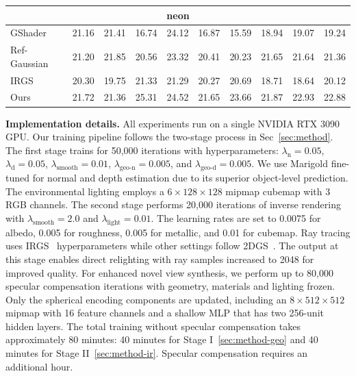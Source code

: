 \begin{table}[h!]
{\begin{tabular}{lccccccccc}
\multicolumn{10}{c}{\textbf{neon}} \\ \hline
\multicolumn{1}{l|}{GShader\cite{jiang2024gaussianshader}} & 21.16 & 21.41 & 16.74 & 24.12 & 16.87 & 15.59 & 18.94 & 19.07 & 19.24 \\
\multicolumn{1}{l|}{Ref-Gaussian\cite{yao2024refgaussian}} & 21.20 & \cellcolor[HTML]{FD6864}21.85 & 20.56 & 23.32 & 20.41 & 20.23 & 21.65 & 21.64 & 21.36 \\
\multicolumn{1}{l|}{IRGS\cite{gu2025irgs}} & 20.30 & 19.75 & 21.33 & 21.29 & 20.27 & 20.69 & 18.71 & 18.64 & 20.12 \\
\multicolumn{1}{l|}{Ours} & \cellcolor[HTML]{FD6864}21.72 & 21.36 & \cellcolor[HTML]{FD6864}25.31 & \cellcolor[HTML]{FD6864}24.52 & \cellcolor[HTML]{FD6864}21.65 & \cellcolor[HTML]{FD6864}23.66 & \cellcolor[HTML]{FD6864}21.87 & \cellcolor[HTML]{FD6864}22.93 & \cellcolor[HTML]{FD6864}22.88 \\ \hline
\hline
\end{tabular}%
}
\vspace{-1em}
\end{table}

\noindent\textbf{Implementation details.}
All experiments run on a single NVIDIA RTX 3090 GPU. Our training pipeline follows the two-stage process in Sec~\ref{sec:method}. The first stage trains for 50,000 iterations with hyperparameters: $\lambda_{\mathrm{n}} = 0.05$, $\lambda_{\mathrm{d}} = 0.05$, $\lambda_{\text{smooth}} = 0.01$, $\lambda_{\text{geo-n}} = 0.005$, and $\lambda_{\text{geo-d}} = 0.005$. We use Marigold fine-tuned for normal and depth estimation due to its superior object-level prediction. The environmental lighting employs a $6 \times 128 \times 128$ mipmap cubemap with 3 RGB channels. The second stage performs 20,000 iterations of inverse rendering with $\lambda_{\text{smooth}} = 2.0$ and $\lambda_{\text{light}} = 0.01$. The learning rates are set to 0.0075 for albedo, 0.005 for roughness, 0.005 for metallic, and 0.01 for cubemap. Ray tracing uses IRGS~\cite{gu2025irgs} hyperparameters while other settings follow 2DGS~\cite{huang20242dgs}. The output at this stage enables direct relighting with ray samples increased to 2048 for improved quality. For enhanced novel view synthesis, we perform up to 80,000 specular compensation iterations with geometry, materials and lighting frozen. Only the spherical encoding components are updated, including an $8 \times 512 \times 512$ mipmap with 16 feature channels and a shallow MLP that has two 256-unit hidden layers. The total training without specular compensation takes approximately 80 minutes: 40 minutes for Stage I~\ref{sec:method-geo} and 40 minutes for Stage II~\ref{sec:method-ir}. Specular compensation requires an additional hour.

